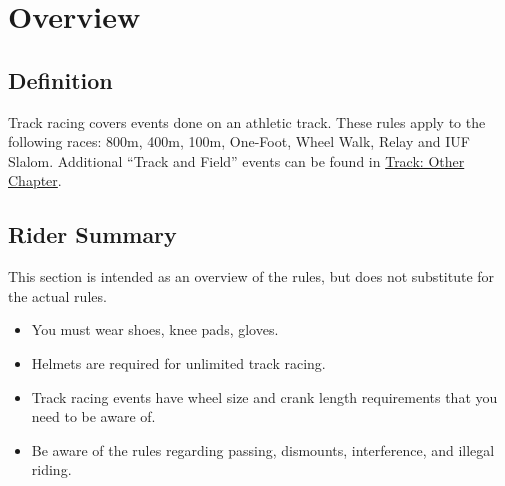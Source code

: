 \chapter{Overview}

\section{Definition}

Track racing covers events done on an athletic track.
These rules apply to the following races: 800m, 400m, 100m, One-Foot, Wheel Walk, Relay and IUF Slalom.
Additional ``Track and Field'' events can be found in \hyperref[part:track-other]{Track: Other Chapter}.

\section{Rider Summary}

This section is intended as an overview of the rules, but does not substitute for the actual rules.
\begin{itemize}
\item You must wear shoes, knee pads, gloves.
\item Helmets are required for unlimited track racing.
\item Track racing events have wheel size and crank length requirements that you need to be aware of.
\item Be aware of the rules regarding passing, dismounts, interference, and illegal riding.
\end{itemize}
